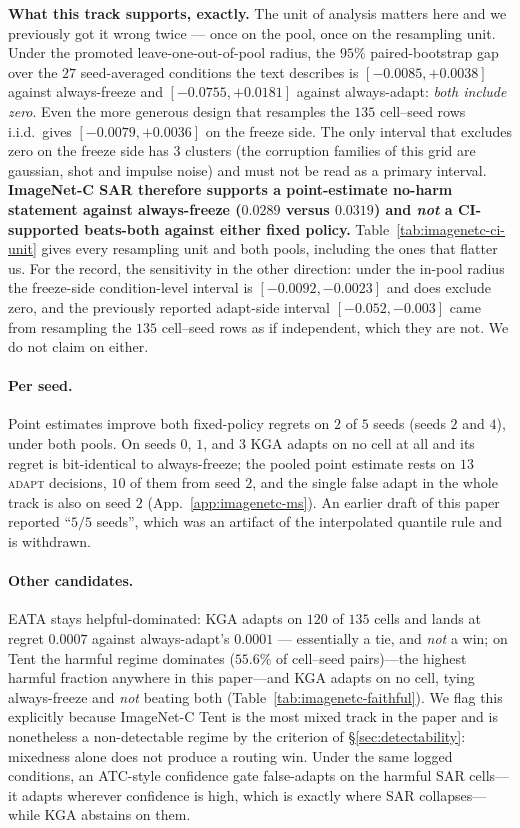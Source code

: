 \textbf{What this track supports, exactly.} The unit of analysis matters here and we previously got
it wrong twice --- once on the pool, once on the resampling unit. Under the promoted
leave-one-out-of-pool radius, the $95\%$ paired-bootstrap gap over the $27$ seed-averaged conditions
the text describes is $[-0.0085,+0.0038]$ against always-freeze and $[-0.0755,+0.0181]$ against
always-adapt: \emph{both include zero}. Even the more generous design that resamples the $135$
cell--seed rows i.i.d.\ gives $[-0.0079,+0.0036]$ on the freeze side. The only interval that
excludes zero on the freeze side has $3$ clusters (the corruption families of this grid are
gaussian, shot and impulse noise) and must not be read as a primary interval.
\textbf{ImageNet-C SAR therefore supports a point-estimate no-harm statement against always-freeze
($0.0289$ versus $0.0319$) and \emph{not} a CI-supported beats-both against either fixed policy.}
Table~\ref{tab:imagenetc-ci-unit} gives every resampling unit and both pools, including the ones
that flatter us. For the record, the sensitivity in the other direction: under the in-pool radius
the freeze-side condition-level interval is $[-0.0092,-0.0023]$ and does exclude zero, and the
previously reported adapt-side interval $[-0.052,-0.003]$ came from resampling the $135$ cell--seed
rows as if independent, which they are not. We do not claim on either.

\paragraph{Per seed.} Point estimates improve both fixed-policy regrets on $2$ of $5$ seeds
(seeds $2$ and $4$), under both pools. On seeds $0$, $1$, and $3$ \textsc{KGA} adapts on no cell at
all and its regret is bit-identical to always-freeze; the pooled point estimate rests on $13$
\textsc{adapt} decisions, $10$ of them from seed $2$, and the single false adapt in the whole track
is also on seed $2$ (App.~\ref{app:imagenetc-ms}). An earlier draft of this paper reported
``$5/5$ seeds'', which was an artifact of the interpolated quantile rule and is withdrawn.

\paragraph{Other candidates.} EATA stays helpful-dominated: \textsc{KGA} adapts on $120$ of $135$
cells and lands at regret $0.0007$ against always-adapt's $0.0001$ --- essentially a tie, and
\emph{not} a win; on Tent the harmful regime dominates ($55.6\%$ of cell--seed
pairs)---the highest harmful fraction anywhere in this paper---and \textsc{KGA} adapts on no cell,
tying always-freeze and \emph{not} beating both (Table~\ref{tab:imagenetc-faithful}). We flag this
explicitly because ImageNet-C Tent is the most mixed track in the paper and is nonetheless a
non-detectable regime by the criterion of \S\ref{sec:detectability}: mixedness alone does not produce
a routing win. Under the
same logged conditions, an ATC-style confidence gate false-adapts on the harmful SAR
cells---it adapts wherever
confidence is high, which is exactly where SAR collapses---while \textsc{KGA} abstains on them.

